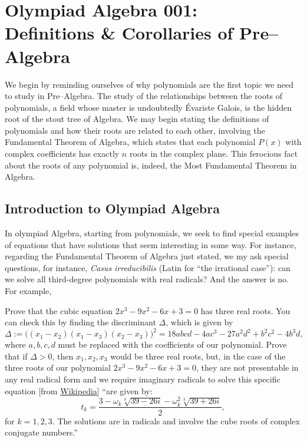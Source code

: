\section{Olympiad Algebra 001:\\ Definitions \& Corollaries of Pre--Algebra}
    We begin by reminding ourselves of why polynomials are the first topic we need to study in Pre--Algebra. The study of the relationships between the roots of polynomials, a field whose master is undoubtedly Évariste Galois, is the hidden root of the stout tree of Algebra. We may begin stating the definitions of polynomials and how their roots are related to each other, involving the Fundamental Theorem of Algebra, which states that each polynomial $P(x)$ with complex coefficients has exactly $n$ roots in the complex plane. This ferocious fact about the roots of any polynomial is, indeed, the Most Fundamental Theorem in Algebra. 

\subsection{Introduction to Olympiad Algebra}

\begin{tcolorbox}[title={Introduction to Olympiad Pre--Algebra}]
In olympiad Algebra, starting from polynomials, we seek to find special examples of equations that have solutions that seem interesting in some way. For instance, regarding the Fundamental Theorem of Algebra just stated, we my ask special questions, for instance, \textit{Casus irreducibilis} (Latin for ``the irrational case''): can we solve all third-degree polynomials with real radicals? And the answer is no. For example,

\begin{question}
    Prove that the cubic equation $2x^{3}-9x^{2}-6x+3=0$ has three real roots. You can check this by finding the discriminant $\Delta$, which is given by \[\Delta:={\bigl (}(x_{1}-x_{2})(x_{1}-x_{3})(x_{2}-x_{3}){\bigr )}^{2}=18abcd-4ac^{3}-27a^{2}d^{2}+b^{2}c^{2}-4b^{3}d,\]
    where $a,b,c,d$ must be replaced with the coefficients of our polynomial. Prove that if $\Delta>0$,  then $x_1,x_2,x_3$ would be three real roots, but, in the case of the three roots of our polynomial $2x^{3}-9x^{2}-6x+3=0$, they are not presentable in any real radical form and we require imaginary radicals to solve this specific equation [from \href{https://en.wikipedia.org/wiki/Casus_irreducibilis}{Wikipedia}] ``are given by: 
    \[{\displaystyle t_{k}={\frac {3-\omega _{k}{\sqrt[{3}]{39-26i}}-\omega _{k}^{2}{\sqrt[{3}]{39+26i}}}{2}}},\]
    for $k=1,2,3$. The solutions are in radicals and involve the cube roots of complex conjugate numbers.''
\end{question}
\end{tcolorbox}

